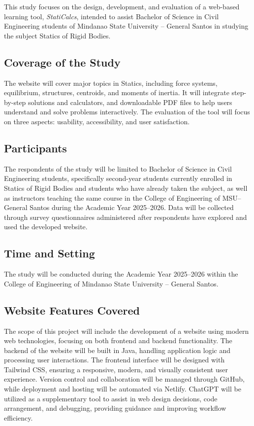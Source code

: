 This study focuses on the design, development, and evaluation of a 
web-based learning tool, \textit{StatiCalcs}, intended to assist 
Bachelor of Science in Civil Engineering students of Mindanao State 
University -- General Santos in studying the subject Statics of Rigid 
Bodies.

\subsection*{Coverage of the Study}

The website will cover major topics in Statics, including force 
systems, equilibrium, structures, centroids, and moments of inertia. 
It will integrate step-by-step solutions and calculators, and 
downloadable PDF files to help users understand and solve problems 
interactively. The evaluation of the tool will focus on three aspects: 
usability, accessibility, and user satisfaction.

\subsection*{Participants}

The respondents of the study will be limited to Bachelor of Science 
in Civil Engineering students, specifically second-year students 
currently enrolled in Statics of Rigid Bodies and students who have 
already taken the subject, as well as instructors teaching the same 
course in the College of Engineering of MSU--General Santos during 
the Academic Year 2025--2026. Data will be collected through survey 
questionnaires administered after respondents have explored and used 
the developed website.

\subsection*{Time and Setting}

The study will be conducted during the Academic Year 2025--2026 
within the College of Engineering of Mindanao State University -- 
General Santos.

\subsection*{Website Features Covered}

The scope of this project will include the development of a website 
using modern web technologies, focusing on both frontend and backend 
functionality. The backend of the website will be built in Java, 
handling application logic and processing user interactions. The 
frontend interface will be designed with Tailwind CSS, ensuring a 
responsive, modern, and visually consistent user experience. Version 
control and collaboration will be managed through GitHub, while 
deployment and hosting will be automated via Netlify. ChatGPT will be 
utilized as a supplementary tool to assist in web design decisions, 
code arrangement, and debugging, providing guidance and improving 
workflow efficiency.

